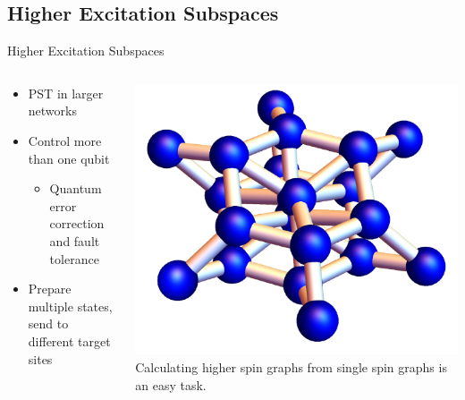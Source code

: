 \documentclass{beamer}
\begin{document}
\subsection{Higher Excitation Subspaces}
\begin{frame}{Higher Excitation Subspaces} %
	\begin{columns}
		\begin{column}{0.5\textwidth}
			\centering
				\begin{itemize}
		\item PST in larger networks%
		\item Control more than one qubit
		\begin{itemize}
			\item Quantum error correction and fault tolerance
		\end{itemize}
		\item Prepare multiple states, send to different target sites
	\end{itemize}
		\end{column}
		\begin{column}{0.5\textwidth}
			\centering
			\includegraphics[trim=0mm 0 0 0mm, width=\textwidth]{Images/multispinex}\\
			Calculating higher spin graphs from single spin graphs is an easy task.
		\end{column}
	\end{columns}
	

\end{frame}
\end{document}
